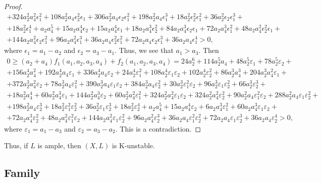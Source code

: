 \documentclass[12pt]{amsart}
\theoremstyle{definition}
\theoremstyle{remark}
\begin{document}
\begin{proof}
\begin{multline*}
+324a_2^2a_4^2\epsilon_1^2+108a_2^2a_4\epsilon_2^2\epsilon_1+306a_2^2a_4\epsilon_2\epsilon_1^2+198a_2^2a_4\epsilon_1^3+18a_2^2\epsilon_2^2\epsilon_1^2+36a_2^2\epsilon_2\epsilon_1^3+\\
+18a_2^2\epsilon_1^4+a_2a_4^5+15a_2a_4^4\epsilon_2+15a_2a_4^4\epsilon_1+18a_2a_4^3\epsilon_2^2+84a_2a_4^3\epsilon_2\epsilon_1+72a_2a_4^3\epsilon_1^2+48a_2a_4^2\epsilon_2^2\epsilon_1+\\
+144a_2a_4^2\epsilon_2\epsilon_1^2+96a_2a_4^2\epsilon_1^3+36a_2a_4\epsilon_2^2\epsilon_1^2+72a_2a_4\epsilon_2\epsilon_1^3+36a_2a_4\epsilon_1^4>0,
\end{multline*}
where $\epsilon_1=a_1-a_2$ and $\epsilon_2=a_3-a_1$. Thus, we see that $a_1>a_3$. Then
\begin{multline*}
0\geqslant (a_2+a_4)f_1(a_1,a_2,a_3,a_4)+f_2(a_1,a_2,a_3,a_4)=24a_2^6+114a_2^5a_4+48a_2^5\varepsilon_1+78a_2^5\varepsilon_2+\\
+156a_2^4a_4^2+192a_2^4a_4\varepsilon_1+336a_2^4a_4\varepsilon_2+24a_2^4\varepsilon_1^2+108a_2^4\varepsilon_1\varepsilon_2+102a_2^4\varepsilon_2^2+86a_2^3a_4^3+204a_2^3a_4^2\varepsilon_1+\\
+372a_2^3a_4^2\varepsilon_2+78a_2^3a_4\varepsilon_1^2+390a_2^3a_4\varepsilon_1\varepsilon_2+384a_2^3a_4\varepsilon_2^2+30a_2^3\varepsilon_1^2\varepsilon_2+96a_2^3\varepsilon_1\varepsilon_2^2+66a_2^3\varepsilon_2^3+\\
+18a_2^2a_4^4+60a_2^2a_4^3\varepsilon_1+144a_2^2a_4^3\varepsilon_2+60a_2^2a_4^2\varepsilon_1^2+324a_2^2a_4^2\varepsilon_1\varepsilon_2+324a_2^2a_4^2\varepsilon_2^2+90a_2^2a_4\varepsilon_1^2\varepsilon_2+288a_2^2a_4\varepsilon_1\varepsilon_2^2+\\
+198a_2^2a_4\varepsilon_2^3+18a_2^2\varepsilon_1^2\varepsilon_2^2+36a_2^2\varepsilon_1\varepsilon_2^3+18a_2^2\varepsilon_2^4+a_2a_4^5+15a_2a_4^4\varepsilon_2+6a_2a_4^3\varepsilon_1^2+60a_2a_4^3\varepsilon_1\varepsilon_2+\\
+72a_2a_4^3\varepsilon_2^2+48a_2a_4^2\varepsilon_1^2\varepsilon_2+144a_2a_4^2\varepsilon_1\varepsilon_2^2+96a_2a_4^2\varepsilon_2^3+36a_2a_4\varepsilon_1^2\varepsilon_2^2+ 72a_2a_4\varepsilon_1\varepsilon_2^3+36a_2a_4\varepsilon_2^4>0,
\end{multline*}
where $\varepsilon_1=a_1-a_3$ and $\varepsilon_2=a_3-a_2$. This is a contradiction.
\end{proof}

Thus, if $L$ is ample, then $(X,L)$ is K-unstable.


\subsection{Family }
\label{subsection:4-9}
\end{document}
